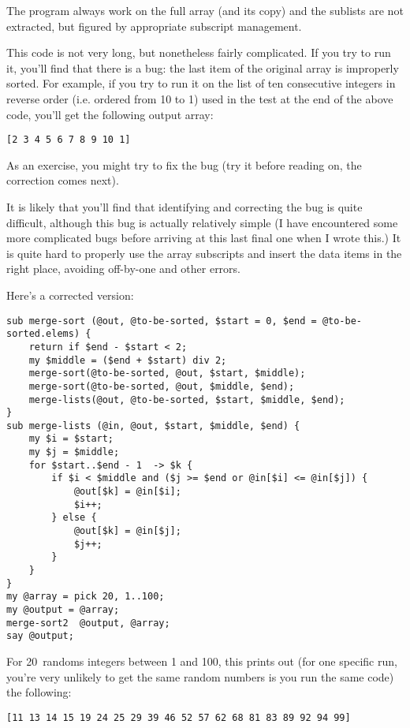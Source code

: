 The program always work on the full array (and its copy) and 
the sublists are not extracted, but figured by appropriate 
subscript management. 

This code is not very long, but nonetheless fairly complicated.
If you try to run it, you'll find that there is a bug: 
the last item of the original array is improperly sorted. For 
example, if you try to run it on the list of ten consecutive 
integers in reverse order (i.e. ordered from 10 to 1) used in 
the test at the end of the above code, you'll get the following 
output array:

\begin{verbatim}
[2 3 4 5 6 7 8 9 10 1]
\end{verbatim}


As an exercise, you might try to fix the bug (try it before reading 
on, the correction comes next). 

It is likely that you'll find that identifying and correcting 
the bug is quite difficult, although this bug is actually 
relatively simple (I have encountered some more complicated 
bugs before arriving at this last final one when I wrote this.) 
It is quite hard to properly use the array subscripts and 
insert the data items in the right place, avoiding off-by-one 
and other errors. 

Here's a corrected version:

\begin{verbatim}
sub merge-sort (@out, @to-be-sorted, $start = 0, $end = @to-be-sorted.elems) {
    return if $end - $start < 2;
    my $middle = ($end + $start) div 2;
    merge-sort(@to-be-sorted, @out, $start, $middle);
    merge-sort(@to-be-sorted, @out, $middle, $end);
    merge-lists(@out, @to-be-sorted, $start, $middle, $end);
}
sub merge-lists (@in, @out, $start, $middle, $end) {
    my $i = $start;
    my $j = $middle;
    for $start..$end - 1  -> $k {
        if $i < $middle and ($j >= $end or @in[$i] <= @in[$j]) {
            @out[$k] = @in[$i];
            $i++;
        } else {
            @out[$k] = @in[$j];
            $j++;
        } 
    }
}
my @array = pick 20, 1..100;
my @output = @array;
merge-sort2  @output, @array;
say @output;
\end{verbatim}

For 20~randoms integers between 1 and 100, this prints 
out (for one specific run, you're very unlikely to get the same 
random numbers is you run the same code) the following:

\begin{verbatim}
[11 13 14 15 19 24 25 29 39 46 52 57 62 68 81 83 89 92 94 99]
\end{verbatim}

